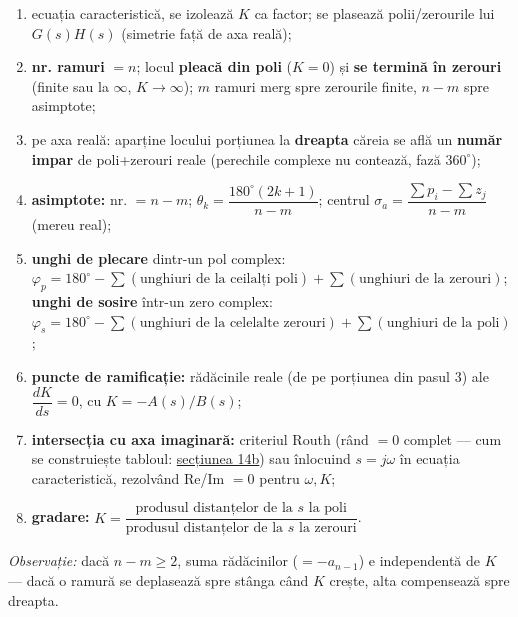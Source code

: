 \documentclass[10pt,a4paper]{article}
\newcommand{\tip}[1]{\textcolor{blue!55!black}{#1}}
\begin{document}
\begin{enumerate}
\item ecuația caracteristică, se izolează $K$ ca factor; se plasează polii/zerourile lui $G(s)H(s)$ (simetrie față de axa reală);
\item \textbf{nr. ramuri} $=n$; locul \textbf{pleacă din poli} ($K{=}0$) și \textbf{se termină în zerouri} (finite sau la $\infty$, $K{\to}\infty$); $m$ ramuri merg spre zerourile finite, $n{-}m$ spre asimptote;
\item pe axa reală: aparține locului porțiunea la \textbf{dreapta} căreia se află un \textbf{număr impar} de poli+zerouri reale (perechile complexe nu contează, fază $360^\circ$);
\item \textbf{asimptote:} nr. $=n-m$; $\theta_k=\dfrac{180^\circ(2k+1)}{n-m}$; centrul $\sigma_a=\dfrac{\sum p_i-\sum z_j}{n-m}$ (mereu real);
\item \textbf{unghi de plecare} dintr-un pol complex: $\varphi_p=180^\circ-\sum(\text{unghiuri de la ceilalți poli})+\sum(\text{unghiuri de la zerouri})$; \textbf{unghi de sosire} într-un zero complex: $\varphi_s=180^\circ-\sum(\text{unghiuri de la celelalte zerouri})+\sum(\text{unghiuri de la poli})$;
\item \textbf{puncte de ramificație:} rădăcinile reale (de pe porțiunea din pasul 3) ale $\dfrac{dK}{ds}=0$, cu $K=-A(s)/B(s)$;
\item \textbf{intersecția cu axa imaginară:} criteriul Routh (rând $=0$ complet — cum se construiește tabloul: \hyperref[sec:14b]{secțiunea 14b}) sau înlocuind $s=j\omega$ în ecuația caracteristică, rezolvând Re/Im $=0$ pentru $\omega,K$;
\item \textbf{gradare:} $K=\dfrac{\text{produsul distanțelor de la }s\text{ la poli}}{\text{produsul distanțelor de la }s\text{ la zerouri}}$.
\end{enumerate}
\tip{\textit{Observație:} dacă $n-m\ge2$, suma rădăcinilor ($=-a_{n-1}$) e independentă de $K$ — dacă o ramură se deplasează spre stânga când $K$ crește, alta compensează spre dreapta.}
\end{document}
